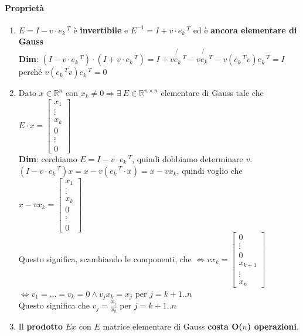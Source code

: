 \documentclass[10pt]{book}
\begin{document}
\paragraph{Proprietà}
\begin{enumerate}
	\item $E = I - v\cdot e_k\,^T$ è \textbf{invertibile} e $E^{-1} = I + v\cdot e_k\,^T$ ed è \textbf{ancora elementare di Gauss}\\
	\textbf{Dim}: $(I - v\cdot e_k\,^T)\cdot(I + v\cdot e_k\,^T) = I + \not{v e_k\,^T} - \not{v e_k\,^T} - v(e_k\,^T v)e_k\,^T = I$ perché $v(e_k\,^T v)e_k\,^T = 0$
	\item Dato $x \in \mathbb{R}^n$ con $x_k \neq 0 \Rightarrow \exists\: E \in \mathbb{R}^{n \times n}$ elementare di Gauss tale che
	\begin{math}
		E\cdot x = \left[ \begin{array}{c}
		x_1\\\vdots\\x_k\\0\\\vdots\\0
		\end{array} \right]	
	\end{math}\\
	\textbf{Dim}: cerchiamo $E = I - v\cdot e_k\,^T$, quindi dobbiamo determinare $v$.\\
	$(I - v\cdot e_k\,^T)x = x - v(e_k\,^T\cdot x) = x - v x_k$, quindi voglio che $x - v x_k = \left[ \begin{array}{c}
	x_1\\\vdots\\x_k\\0\\\vdots\\0
\end{array} \right]$\\
	Questo significa, scambiando le componenti, che $\Leftrightarrow v x_k = \left[ \begin{array}{c}
	0\\\vdots\\0\\x_{k+1}\\\vdots\\x_n
\end{array} \right]$\\
	$\Leftrightarrow v_1 = \ldots = v_k = 0 \wedge v_j x_k = x_j$ per $j = k+1..n$\\
	 Questo significa che $v_j = \frac{x_j}{x_k}$ per $j = k+1..n$
	 \item Il \textbf{prodotto} $E x$ con $E$ matrice elementare di Gauss \textbf{costa O($n$) operazioni}.\\

\end{enumerate}
\end{document}
